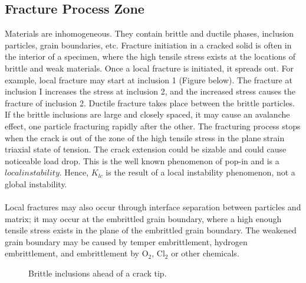 \documentclass[12pt]{article}
\begin{document}
\subsection{Fracture Process Zone}
Materials are inhomogeneous. They contain brittle and ductile phases, inclusion particles, grain
boundaries, etc. Fracture initiation in a cracked solid is often in the interior of a specimen, where the
high tensile stress exists at the locations of brittle and weak materials. Once a local fracture is initiated,
it spreads out. For example, local fracture may start at inclusion 1 (Figure below). The fracture at inclusion I
increases the stress at inclusion 2, and the increased stress causes the fracture of inclusion 2. Ductile
fracture takes place between the brittle particles. If the brittle inclusions are large and closely spaced, it
may cause an avalanche effect, one particle fracturing rapidly after the other. The fracturing process
stops when the crack is out of the zone of the high tensile stress in the plane strain triaxial state of
tension. The crack extension could be sizable and could cause noticeable load drop. This is the well
known phenomenon of pop-in and is a $local instability$. Hence, $K_{lc}$ is the result of a local instability
phenomenon, not a global instability.
\\\\
Local fractures may also occur through interface separation between particles and matrix; it may
occur at the embrittled grain boundary, where a high enough tensile stress exists in the plane of the
embrittled grain boundary. The weakened grain boundary may be caused by temper embrittlement,
hydrogen embrittlement, and embrittlement by $\text{O}_\text{2}$, $\text{Cl}_\text{2}$ or other chemicals.

\begin{figure}[H]
    \centering
    \captionsetup{labelformat=empty}
    \caption{Brittle inclusions ahead of a crack tip.}
\end{figure}
\end{document}
